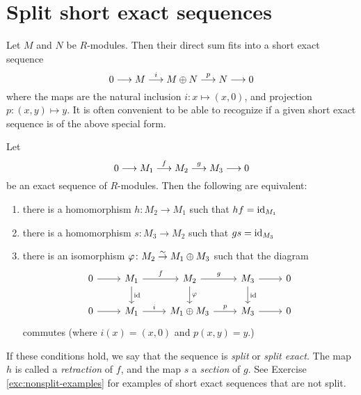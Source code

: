 \section{Split short exact sequences}

Let $M$ and $N$ be $R$-modules. Then their direct sum fits into a short exact sequence
\[
	0 \longrightarrow M \overset{i}{\longrightarrow} M\oplus N \overset{p}{\longrightarrow} N \longrightarrow 0
\]
where the maps are the natural inclusion $i\colon x\mapsto (x,0)$, and projection $p\colon (x,y)\mapsto y$. It is often convenient to be able to recognize if a given short exact sequence is of the above special form.

\begin{theorem}\label{thm:splitting-lemma}
Let
\[
	0 \longrightarrow M_1 \overset{f}{\longrightarrow} M_2 \overset{g}{\longrightarrow} M_3 \longrightarrow 0
\]
be an exact sequence of $R$-modules. Then the following are equivalent:
\begin{enumerate}
\item there is a homomorphism $h\colon M_2 \to M_1$ such that $hf={\rm id}_{M_1}$
\item there is a homomorphism $s\colon M_3 \to M_2$ such that $gs={\rm id}_{M_3}$
\item there is an isomorphism $\varphi\colon M_2 \overset{\sim}{\to} M_1 \oplus M_3$ such that the diagram
\[
\begin{tikzcd}
0 \arrow{r} & M_1 \arrow{r}{f} \arrow{d}{\id} 
	& M_2 \arrow{r}{g} \arrow{d}{\varphi} 
	& M_3 \arrow{r} \arrow{d}{\id} & 0 \\
0 \arrow{r} & M_1 \arrow{r}{i} & M_1 \oplus M_3 \arrow{r}{p} & M_3 \arrow{r} & 0
\end{tikzcd}
\]
commutes (where $i(x)=(x,0)$ and $p(x,y)=y$.)
\end{enumerate}
\end{theorem}

If these conditions hold, we say that the sequence is \emph{split} or \emph{split exact}. The map $h$ is called a \emph{retraction} of $f$, and the map $s$ a \emph{section} of $g$. See Exercise \ref{exc:nonsplit-examples} for examples of short exact sequences that are not split.

